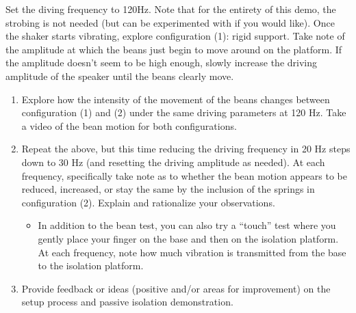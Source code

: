\documentclass[12pt,letterpaper,english]{article}
\begin{document}
Set the diving frequency to 120Hz. Note that for the entirety of this demo, the strobing is not needed (but can be experimented with if you would like). Once the shaker starts vibrating, explore configuration (1): rigid support.  Take note of the amplitude at which the beans just begin to move around on the platform. If the amplitude doesn't seem to be high enough, slowly increase the driving amplitude of the speaker until the beans clearly move.  \\

\begin{enumerate}

\item Explore how the intensity of the movement of the beans changes between configuration (1) and (2) under the same driving parameters at 120 Hz.  Take a video of the bean motion for both configurations. 
\item Repeat the above, but this time reducing the driving frequency in 20 Hz steps down to 30 Hz (and resetting the driving amplitude as needed).  
At each frequency, specifically take note as to whether the bean motion appears to be reduced, increased, or stay the same by the inclusion of the springs in configuration (2).  Explain and rationalize your observations.
\begin{itemize}
\item {\small In addition to the bean test, you can also try a ``touch'' test where you gently place your finger on the base and then on the isolation platform.  At each frequency, note how much vibration is transmitted from the base to the isolation platform.}

\end{itemize}

\item Provide feedback or ideas (positive and/or areas for improvement) on the setup process and passive isolation demonstration. 





\end{enumerate}
\end{document}
